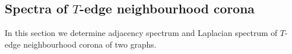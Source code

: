 \documentclass[a4paper,12pt]{article}
\newtheorem{corollary}{Corollary}[section]
\begin{document}
\subsection{Spectra of $T$-edge neighbourhood corona}
In this section we determine adjacency spectrum and Laplacian spectrum of $T$-edge neighbourhood corona of two graphs.
\end{document}

